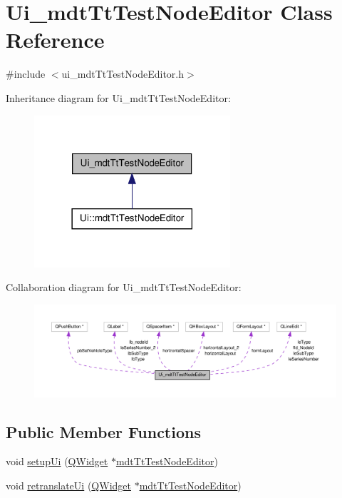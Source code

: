 \hypertarget{class_ui__mdt_tt_test_node_editor}{\section{Ui\-\_\-mdt\-Tt\-Test\-Node\-Editor Class Reference}
\label{class_ui__mdt_tt_test_node_editor}
}


{\ttfamily \#include $<$ui\-\_\-mdt\-Tt\-Test\-Node\-Editor.\-h$>$}



Inheritance diagram for Ui\-\_\-mdt\-Tt\-Test\-Node\-Editor\-:\nopagebreak
\begin{figure}[H]
\begin{center}
\leavevmode
\includegraphics[width=206pt]{class_ui__mdt_tt_test_node_editor__inherit__graph}
\end{center}
\end{figure}


Collaboration diagram for Ui\-\_\-mdt\-Tt\-Test\-Node\-Editor\-:\nopagebreak
\begin{figure}[H]
\begin{center}
\leavevmode
\includegraphics[width=350pt]{class_ui__mdt_tt_test_node_editor__coll__graph}
\end{center}
\end{figure}
\subsection*{Public Member Functions}
\begin{DoxyCompactItemize}
\item 
void \hyperlink{class_ui__mdt_tt_test_node_editor_a3aee4d826be297242bbecbf92f55e791}{setup\-Ui} (\hyperlink{class_q_widget}{Q\-Widget} $\ast$\hyperlink{classmdt_tt_test_node_editor}{mdt\-Tt\-Test\-Node\-Editor})
\item 
void \hyperlink{class_ui__mdt_tt_test_node_editor_aeaf446cfa9a8854cba44a1072a716133}{retranslate\-Ui} (\hyperlink{class_q_widget}{Q\-Widget} $\ast$\hyperlink{classmdt_tt_test_node_editor}{mdt\-Tt\-Test\-Node\-Editor})
\end{DoxyCompactItemize}
